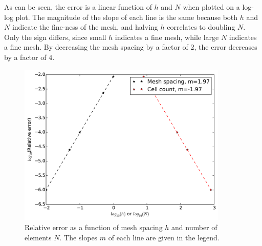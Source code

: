 \documentclass[10pt]{article}
\newcommand*\circled[1]{\tikz[baseline=(char.base)]{
            \node[shape=circle,draw,inner sep=2pt] (char) {#1};}}
\numberwithin{equation}{section} %
\begin{document}
\circled{4}\newline

As can be seen, the error is a linear function of \(h\) and \(N\) when plotted on a log-log plot. The magnitude of the slope of each line is the same because both \(h\) and \(N\) indicate the fine-ness of the mesh, and halving \(h\) correlates to doubling \(N\). Only the sign differs, since small \(h\) indicates a fine mesh, while large \(N\) indicates a fine mesh. By decreasing the mesh spacing by a factor of 2, the error decreases by a factor of 4. 

\begin{figure}[H]
  \centering
  \includegraphics[width=10cm]{Question4.pdf}
  \caption{Relative error as a function of mesh spacing \(h\) and number of elements \(N\). The slopes \(m\) of each line are given in the legend.}
\end{figure}

\circled{5}\newline
\end{document}
